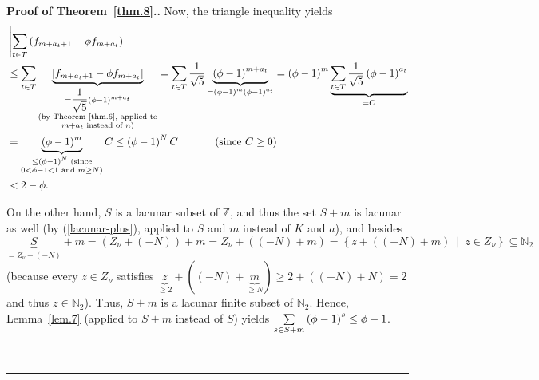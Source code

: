 \documentclass[numbers=enddot,12pt,final,onecolumn,notitlepage]{scrartcl}%
\numberwithin{exer}{section}
\theoremstyle{definition}
\newenvironment{proof}[1][Proof]{\noindent\textbf{#1.} }{\ \rule{0.5em}{0.5em}}
\let\sumnonlimits\sum
\renewcommand{\sum}{\sumnonlimits\limits}
\begin{document}
\begin{proof}[Proof of Theorem~\ref{thm.8}.]
Now, the triangle inequality yields%
\begin{align*}
&  \left\vert \sum\limits_{t\in T}\left(  f_{m+a_{t}+1}-\phi f_{m+a_{t}%
}\right)  \right\vert \\
&  \leq\sum\limits_{t\in T}\underbrace{\left\vert f_{m+a_{t}+1}-\phi
f_{m+a_{t}}\right\vert }_{\substack{=\dfrac{1}{\sqrt{5}}\left(  \phi-1\right)
^{m+a_{t}}\\\text{(by Theorem~\ref{thm.6}, applied to}\\m+a_{t}\text{ instead of
}n\text{)}}}=\sum\limits_{t\in T}\dfrac{1}{\sqrt{5}}\underbrace{\left(
\phi-1\right)  ^{m+a_{t}}}_{=\left(  \phi-1\right)  ^{m}\left(  \phi-1\right)
^{a_{t}}}=\left(  \phi-1\right)  ^{m}\underbrace{\sum\limits_{t\in T}\dfrac
{1}{\sqrt{5}}\left(  \phi-1\right)  ^{a_{t}}}_{=C}\\
&  =\underbrace{\left(  \phi-1\right)  ^{m}}_{\substack{\leq\left(
\phi-1\right)  ^{N}\text{ (since}\\0<\phi-1<1\text{ and }m\geq N\text{)}%
}}C\leq\left(  \phi-1\right)  ^{N}C\ \ \ \ \ \ \ \ \ \ \left(  \text{since
}C\geq0\right) \\
&  <2-\phi.
\end{align*}


On the other hand, $S$ is a lacunar subset of $\mathbb{Z}$, and thus the set
$S+m$ is lacunar as well (by (\ref{lacunar-plus}), applied to $S$ and $m$
instead of $K$ and $a$), and besides $\underbrace{S}_{=Z_{\nu}+\left(
-N\right)  }+m=\left(  Z_{\nu}+\left(  -N\right)  \right)  +m=Z_{\nu}+\left(
\left(  -N\right)  +m\right)  =\left\{  z+\left(  \left(  -N\right)
+m\right)  \ \mid\ z\in Z_{\nu}\right\}  \subseteq\mathbb{N}_{2}$ (because
every $z\in Z_{\nu}$ satisfies $\underbrace{z}_{\geq2}+\left(  \left(
-N\right)  +\underbrace{m}_{\geq N}\right)  \geq2+\left(  \left(  -N\right)
+N\right)  =2$ and thus $z\in\mathbb{N}_{2}$). Thus, $S+m$ is a lacunar finite
subset of $\mathbb{N}_{2}$. Hence, Lemma~\ref{lem.7} (applied to $S+m$ instead of $S$)
yields $\sum\limits_{s\in S+m}\left(  \phi-1\right)  ^{s}\leq\phi-1$.


\end{proof}
\end{document}
